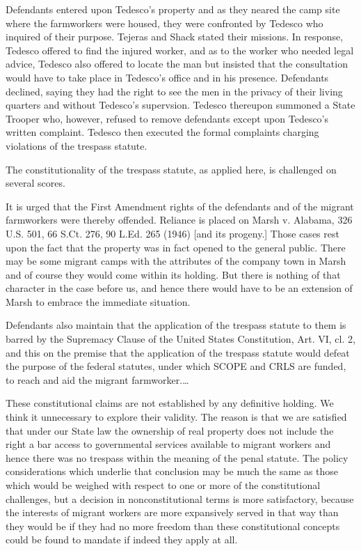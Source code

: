 Defendants entered upon Tedesco's property and as they neared the camp site
where the farmworkers were housed, they were confronted by Tedesco who inquired
of their purpose. Tejeras and Shack stated their missions. In response, Tedesco
offered to find the injured worker, and as to the worker who needed legal
advice, Tedesco also offered to locate the man but insisted that the
consultation would have to take place in Tedesco's office and in his presence.
Defendants declined, saying they had the right to see the men in the privacy of
their living quarters and without Tedesco's supervsion. Tedesco thereupon
summoned a State Trooper who, however, refused to remove defendants except upon
Tedesco's written complaint. Tedesco then executed the formal complaints
charging violations of the trespass statute.


The constitutionality of the trespass statute, as applied here, is challenged on
several scores.

It is urged that the First Amendment rights of the defendants and of the migrant
farmworkers were thereby offended. Reliance is placed on Marsh v. Alabama, 326
U.S. 501, 66 S.Ct. 276, 90 L.Ed. 265 (1946) [and its progeny.] Those cases rest
upon the fact that the property was in fact opened to the general public. There
may be some migrant camps with the attributes of the company town in Marsh and
of course they would come within its holding. But there is nothing of that
character in the case before us, and hence there would have to be an extension
of Marsh to embrace the immediate situation.

Defendants also maintain that the application of the trespass statute to them is
barred by the Supremacy Clause of the United States Constitution, Art. VI, cl.
2, and this on the premise that the application of the trespass statute would
defeat the purpose of the federal statutes, under which SCOPE and CRLS are
funded, to reach and aid the migrant farmworker.\ldots

These constitutional claims are not established by any definitive holding. We
think it unnecessary to explore their validity. The reason is that we are
satisfied that under our State law the ownership of real property does not
include the right a bar access to governmental services available to migrant
workers and hence there was no trespass within the meaning of the penal
statute. The policy considerations which underlie that conclusion may be much
the same as those which would be weighed with respect to one or more of the
constitutional challenges, but a decision in nonconstitutional terms is more
satisfactory, because the interests of migrant workers are more expansively
served in that way than they would be if they had no more freedom than these
constitutional concepts could be found to mandate if indeed they apply at all.

